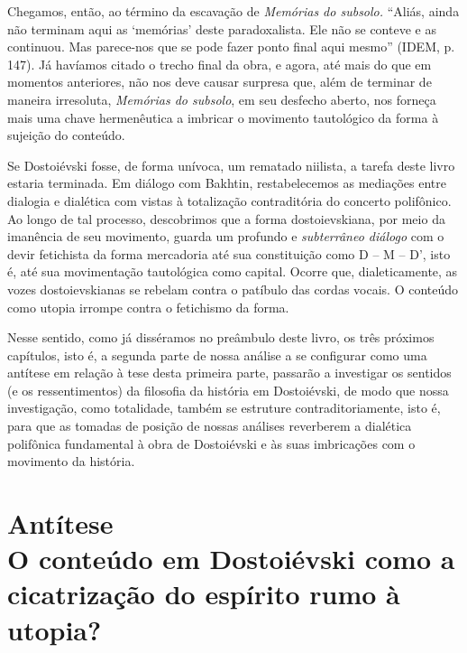 Chegamos, então, ao término da escavação de \emph{Memórias do subsolo.}
``Aliás, ainda não terminam aqui as `memórias' deste paradoxalista. Ele
não se conteve e as continuou. Mas parece-nos que se pode fazer ponto
final aqui mesmo'' (IDEM, p. 147). Já havíamos citado o trecho final da
obra, e agora, até mais do que em momentos anteriores, não nos deve
causar surpresa que, além de terminar de maneira irresoluta,
\emph{Memórias do subsolo}, em seu desfecho aberto, nos forneça mais uma
chave hermenêutica a imbricar o movimento tautológico da forma à
sujeição do conteúdo.

Se Dostoiévski fosse, de forma unívoca, um rematado niilista, a tarefa
deste livro estaria terminada. Em diálogo com Bakhtin, restabelecemos as
mediações entre dialogia e dialética com vistas à totalização
contraditória do concerto polifônico. Ao longo de tal processo,
descobrimos que a forma dostoievskiana, por meio da imanência de seu
movimento, guarda um profundo e \emph{subterrâneo diálogo} com o devir
fetichista da forma mercadoria até sua constituição como D -- M -- D',
isto é, até sua movimentação tautológica como capital. Ocorre que,
dialeticamente, as vozes dostoievskianas se rebelam contra o patíbulo
das cordas vocais. O conteúdo como utopia irrompe contra o fetichismo da
forma.

Nesse sentido, como já disséramos no preâmbulo deste livro, os três
próximos capítulos, isto é, a segunda parte de nossa análise a se
configurar como uma antítese em relação à tese desta primeira parte,
passarão a investigar os sentidos (e os ressentimentos) da filosofia da
história em Dostoiévski, de modo que nossa investigação, como
totalidade, também se estruture contraditoriamente, isto é, para que as
tomadas de posição de nossas análises reverberem a dialética polifônica
fundamental à obra de Dostoiévski e às suas imbricações com o movimento
da história.

\part[Parte II -- Antítese]
{Antítese\\[\bigskipamount] 
      \large O conteúdo em Dostoiévski como a cicatrização do espírito rumo à utopia?}

